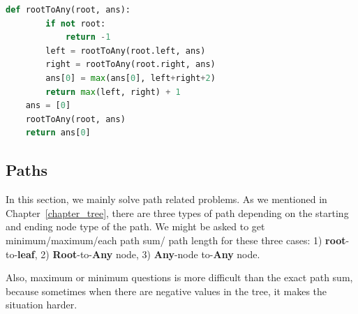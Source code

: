 \documentclass[../main.tex]{subfiles}
\begin{document}
\begin{examples}[resume]
\begin{lstlisting}[language=Python]
    def rootToAny(root, ans):
        if not root:
            return -1
        left = rootToAny(root.left, ans)
        right = rootToAny(root.right, ans)
        ans[0] = max(ans[0], left+right+2)
        return max(left, right) + 1
    ans = [0]
    rootToAny(root, ans)
    return ans[0]
\end{lstlisting}
\end{examples}
\subsection{Paths} 
In this section, we mainly solve path related problems. As we mentioned in Chapter~\ref{chapter_tree}, there are three types of path depending on the starting and ending node type of the path. We might be asked to get minimum/maximum/each path sum/ path length for these three cases: 1) \textbf{root}-to-\textbf{leaf}, 2) \textbf{Root}-to-\textbf{Any} node, 3) \textbf{Any}-node to-\textbf{Any} node. 

Also, maximum or minimum questions is more difficult than the exact path sum, because sometimes when there are negative values in the tree, it makes the situation harder. 


\end{document}
